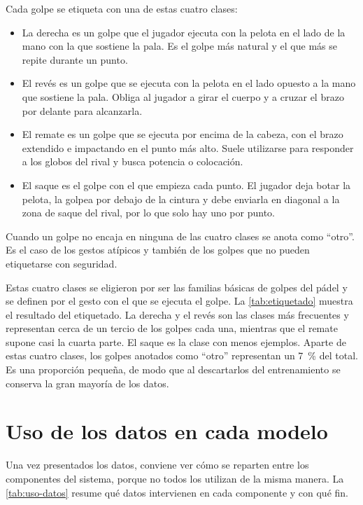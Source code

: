 Cada golpe se etiqueta con una de estas cuatro clases:
\begin{itemize}
  \item La derecha es un golpe que el jugador ejecuta con la pelota en el lado de la mano con la que sostiene la pala. Es el golpe más natural y el que más se repite durante un punto.
  \item El revés es un golpe que se ejecuta con la pelota en el lado opuesto a la mano que sostiene la pala. Obliga al jugador a girar el cuerpo y a cruzar el brazo por delante para alcanzarla.
  \item El remate es un golpe que se ejecuta por encima de la cabeza, con el brazo extendido e impactando en el punto más alto. Suele utilizarse para responder a los globos del rival y busca potencia o colocación.
  \item El saque es el golpe con el que empieza cada punto. El jugador deja botar la pelota, la golpea por debajo de la cintura y debe enviarla en diagonal a la zona de saque del rival, por lo que solo hay uno por punto.
\end{itemize}
Cuando un golpe no encaja en ninguna de las cuatro clases se anota como ``otro''.
Es el caso de los gestos atípicos y también de los golpes que no pueden etiquetarse con seguridad.

Estas cuatro clases se eligieron por ser las familias básicas de golpes del pádel y se definen por el gesto con el que se ejecuta el golpe.
La \cref{tab:etiquetado} muestra el resultado del etiquetado.
La derecha y el revés son las clases más frecuentes y representan cerca de un tercio de los golpes cada una, mientras que el remate supone casi la cuarta parte.
El saque es la clase con menos ejemplos.
Aparte de estas cuatro clases, los golpes anotados como ``otro'' representan un 7~\% del total.
Es una proporción pequeña, de modo que al descartarlos del entrenamiento se conserva la gran mayoría de los datos.

\begin{table}[htbp]
  \centering
  \caption{Reparto del etiquetado propio por tipo de golpe.}
  \label{tab:etiquetado}
  
\end{table}

\section{Uso de los datos en cada modelo}
\label{sec:uso-datos}

Una vez presentados los datos, conviene ver cómo se reparten entre los componentes del sistema, porque no todos los utilizan de la misma manera.
La \cref{tab:uso-datos} resume qué datos intervienen en cada componente y con qué fin.

\begin{table}[htbp]
  \centering
  \caption{Datos que utiliza cada componente del sistema.}
  \label{tab:uso-datos}
  \small
  
\end{table}
